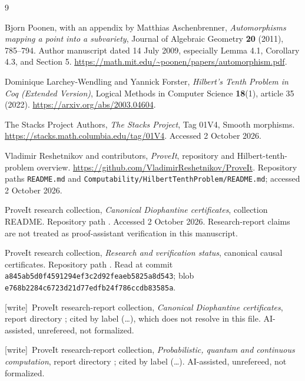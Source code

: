 \documentclass[11pt,a4paper]{article}
\theoremstyle{definition}
\theoremstyle{remark}
\newcommand{\wtag}{\textup{[write]}}
\begin{document}
\begin{thebibliography}{9}

Bjorn Poonen, with an appendix by Matthias Aschenbrenner,
\emph{Automorphisms mapping a point into a subvariety},
Journal of Algebraic Geometry \textbf{20} (2011), 785--794.
Author manuscript dated 14 July 2009, especially Lemma 4.1,
Corollary 4.3, and Section 5.
\url{https://math.mit.edu/~poonen/papers/automorphism.pdf}.

Dominique Larchey-Wendling and Yannick Forster,
\emph{Hilbert's Tenth Problem in Coq (Extended Version)},
Logical Methods in Computer Science \textbf{18}(1), article 35 (2022).
\url{https://arxiv.org/abs/2003.04604}.

The Stacks Project Authors,
\emph{The Stacks Project}, Tag 01V4, Smooth morphisms.
\url{https://stacks.math.columbia.edu/tag/01V4}.
Accessed 2 October 2026.

Vladimir Reshetnikov and contributors,
\emph{ProveIt}, repository and Hilbert-tenth-problem overview.
\url{https://github.com/VladimirReshetnikov/ProveIt}.
Repository paths \texttt{README.md} and
\texttt{Computability/HilbertTenthProblem/README.md}; accessed
2 October 2026.

ProveIt research collection,
\emph{Canonical Diophantine certificates}, collection README.
Repository path
.
Accessed 2 October 2026. Research-report claims are not treated as
proof-assistant verification in this manuscript.

ProveIt research collection,
\emph{Research and verification status}, canonical causal certificates.
Repository path
.
Read at commit \texttt{a845ab5d0f4591294ef3c2d92feaeb5825a8d543};
blob \texttt{e768b2284c6723d21d77edfb24f786ccdb83585a}.

\wtag\ ProveIt research-report collection,
\emph{Canonical Diophantine certificates}, report directory
;
cited by label (\dots), which does not resolve in this file.
AI-assisted, unrefereed, not formalized.

\wtag\ ProveIt research-report collection,
\emph{Probabilistic, quantum and continuous computation}, report directory
;
cited by label (\dots). AI-assisted, unrefereed, not
formalized.


\end{thebibliography}
\end{document}

